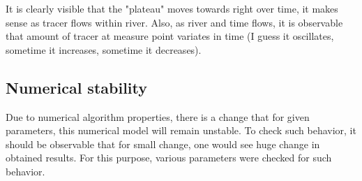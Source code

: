 \documentclass[onecolumn]{article}
\begin{document}
\noindent{}
\noindent{}

It is clearly visible that the "plateau" moves towards right over time, it makes sense as tracer flows within river. Also, as river and time flows, it is observable that amount of tracer at measure point variates in time (I guess it oscillates, sometime it increases, sometime it decreases).

\subsection{Numerical stability}
Due to numerical algorithm properties, there is a change that for given parameters, this numerical model will remain unstable. To check such behavior, it should be observable that for small change, one would see huge change in obtained results. For this purpose, various parameters were checked for such behavior.
\end{document}
